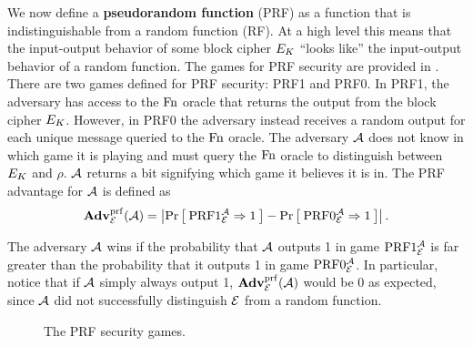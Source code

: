 We now define a \textbf{pseudorandom function} (PRF) as a function that is indistinguishable from a random function (RF). At a high level this means that the input-output behavior of some block cipher $E_K$ ``looks like'' the input-output behavior of a random function. The games for PRF security are provided in . There are two games defined for PRF security: PRF1 and PRF0. In PRF1, the adversary has access to the $\textnormal{Fn}$ oracle that returns the output from the block cipher $E_K$. However, in PRF0 the adversary instead receives a random output for each unique message queried to the $\textnormal{Fn}$ oracle. The adversary ${\mathcal A}$ does not know in which game it is playing and must query the $\textnormal{Fn}$ oracle to distinguish between $E_K$ and $\rho$. ${\mathcal A}$ returns a bit signifying which game it believes it is in. The PRF advantage for ${\mathcal A}$ is defined as 
\begin{equation*}
\mathbf{Adv}^{\mathrm{prf}}_{{\cal E}}({\mathcal A}) = \left| \Pr\left[\: \textnormal{PRF}1_{\cal E}^{\mathcal A}\Rightarrow 1 \:\right] 
- \Pr\left[\: \textnormal{PRF}0_{\cal E}^{\mathcal A}\Rightarrow1 \:\right] \right|.
\end{equation*}

The adversary ${\mathcal A}$ wins if the probability that ${\mathcal A}$ outputs 1 in game $\textnormal{PRF}1_{\cal E}^{\mathcal A}$ is far greater than the probability that it outputs 1 in game $\textnormal{PRF}0_{\cal E}^{\mathcal A}$. In particular, notice that if ${\mathcal A}$ simply always output 1, $\mathbf{Adv}^{\mathrm{prf}}_{{\cal E}}({\mathcal A})$ would be 0 as expected, since ${\mathcal A}$ did not successfully distinguish ${\cal E}$ from a random function. 

\begin{figure}
	\centering
\caption{The PRF security games.}
\label{fig:prf}
\end{figure} 

